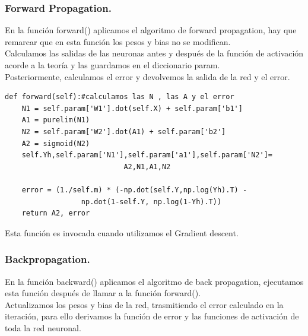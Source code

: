 \documentclass[a4paper,11pt]{article}
\begin{document}
\subsubsection{Forward Propagation.}

En la función forward() aplicamos el algoritmo de forward propagation, hay que remarcar que en esta función los pesos y bias no se modifican.\\ Calculamos las salidas de las neuronas antes y después de la función de activación acorde a la teoría y las guardamos en el diccionario param.\\

\noindent
Posteriormente, calculamos el error y devolvemos la salida de la red y el error.
\begin{lstlisting}
def forward(self):#calculamos las N , las A y el error
    N1 = self.param['W1'].dot(self.X) + self.param['b1']
    A1 = purelim(N1)
    N2 = self.param['W2'].dot(A1) + self.param['b2']
    A2 = sigmoid(N2)
    self.Yh,self.param['N1'],self.param['a1'],self.param['N2']=
						    A2,N1,A1,N2

    error = (1./self.m) * (-np.dot(self.Y,np.log(Yh).T) - 
			      np.dot(1-self.Y, np.log(1-Yh).T))
    return A2, error
\end{lstlisting}
Esta función es invocada cuando utilizamos el Gradient descent.
\subsubsection{Backpropagation.}

En la función backward() aplicamos el algoritmo de back propagation, ejecutamos esta función después de llamar a la función forward(). \\

\noindent
Actualizamos los pesos y bias de la red, trasmitiendo el error calculado en la iteración, para ello derivamos la función de error y las funciones de activación de toda la red neuronal. \\
\end{document}

